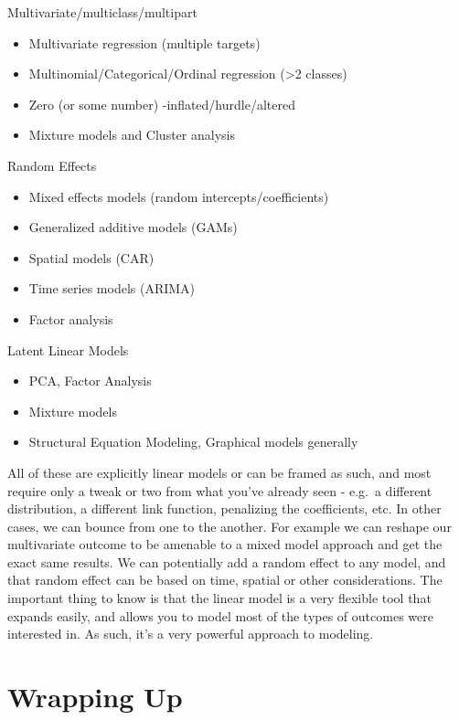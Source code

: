 \documentclass[
  letterpaper,
]{krantz}
\providecommand{\tightlist}{%
  \setlength{\itemsep}{0pt}\setlength{\parskip}{0pt}}\usepackage{longtable,booktabs,array}
\begin{document}
Multivariate/multiclass/multipart

\begin{itemize}
\tightlist
\item
  Multivariate regression (multiple targets)
\item
  Multinomial/Categorical/Ordinal regression (\textgreater2 classes)
\item
  Zero (or some number) -inflated/hurdle/altered
\item
  Mixture models and Cluster analysis
\end{itemize}

Random Effects

\begin{itemize}
\tightlist
\item
  Mixed effects models (random intercepts/coefficients)
\item
  Generalized additive models (GAMs)
\item
  Spatial models (CAR)
\item
  Time series models (ARIMA)
\item
  Factor analysis
\end{itemize}

Latent Linear Models

\begin{itemize}
\tightlist
\item
  PCA, Factor Analysis
\item
  Mixture models
\item
  Structural Equation Modeling, Graphical models generally
\end{itemize}

All of these are explicitly linear models or can be framed as such, and
most require only a tweak or two from what you've already seen - e.g.~a
different distribution, a different link function, penalizing the
coefficients, etc. In other cases, we can bounce from one to the
another. For example we can reshape our multivariate outcome to be
amenable to a mixed model approach and get the exact same results. We
can potentially add a random effect to any model, and that random effect
can be based on time, spatial or other considerations. The important
thing to know is that the linear model is a very flexible tool that
expands easily, and allows you to model most of the types of outcomes
were interested in. As such, it's a very powerful approach to modeling.

\section{Wrapping Up}\label{sec-lm-wrap}
\end{document}
